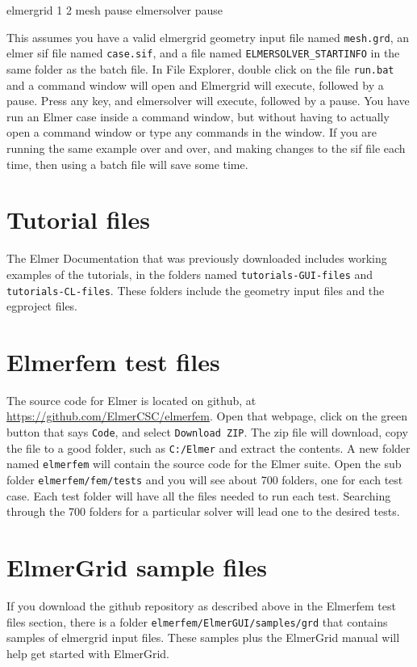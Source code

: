 \ttbegin
elmergrid 1 2 mesh
pause
elmersolver
pause
\ttend

This assumes you have a valid elmergrid geometry input file named \texttt{mesh.grd}, an elmer sif file named \texttt{case.sif}, and a file named \texttt{ELMERSOLVER\_STARTINFO} in the same folder as the batch file.  In File Explorer, double click on the file \texttt{run.bat} and a command window will open and Elmergrid will execute, followed by a pause.  Press any key, and elmersolver will execute, followed by a pause.  You have run an Elmer case inside a command window, but without having to actually open a command window or type any commands in the window.  If you are running the same example over and over, and making changes to the sif file each time, then using a batch file will save some time.

\section{Tutorial files}

The Elmer Documentation that was previously downloaded includes working examples of the tutorials, in the folders named  \texttt{tutorials-GUI-files} and  \texttt{tutorials-CL-files}.  These folders include the geometry input files and the egproject files.

\section{Elmerfem test files}

The source code for Elmer is located on github, at \url{https://github.com/ElmerCSC/elmerfem}.  Open that webpage, click on the green button that says \texttt{Code}, and select \texttt{Download ZIP}.  The zip file will download, copy the file to a good folder, such as \texttt{C:/Elmer} and extract the contents.  A new folder named \texttt{elmerfem} will contain the source code for the Elmer suite.  Open the sub folder \texttt{elmerfem/fem/tests} and you will see about 700 folders, one for each test case.  Each test folder will have all the files needed to run each test.  Searching through the 700 folders for a particular solver will lead one to the desired tests.

\section{ElmerGrid sample files}

If you download the github repository as described above in the Elmerfem test files section, there is a folder \texttt{elmerfem/ElmerGUI/samples/grd} that contains samples of elmergrid input files.  These samples plus the ElmerGrid manual will help get started with ElmerGrid.

